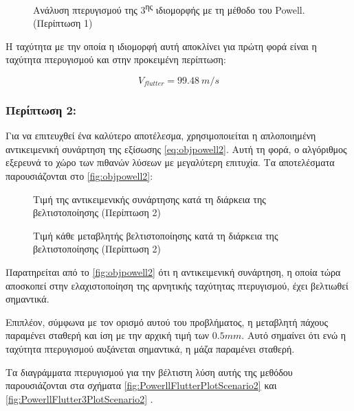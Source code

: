 \begin{figure}[H]
    \centering
    
    \caption{Ανάλυση πτερυγισμού της 3\textsuperscript{ης} ιδιομορφής με τη μέθοδο του \textlatin{Powell}. (Περίπτωση 1)}
    \label{fig:Mode3FlutteranalysisPowellsmethodScenario1}
\end{figure}

Η ταχύτητα με την οποία η ιδιομορφή αυτή αποκλίνει για πρώτη φορά είναι η ταχύτητα πτερυγισμού και στην προκειμένη περίπτωση:


\begin{equation}
V_{flutter} = 99.48\ m/s
\end{equation}

\subsubsection{Περίπτωση 2:}

Για να επιτευχθεί ένα καλύτερο αποτέλεσμα, χρησιμοποιείται η απλοποιημένη αντικειμενική συνάρτηση της εξίσωσης \eqref{eq:objpowell2}. 
Αυτή τη φορά, ο αλγόριθμος εξερευνά το χώρο των πιθανών λύσεων με μεγαλύτερη επιτυχία. Τα αποτελέσματα παρουσιάζονται στο \autoref{fig:objpowell2}:


\begin{figure}[H]
    \centering
    
    \caption{Τιμή της αντικειμενικής συνάρτησης κατά τη διάρκεια της βελτιστοποίησης (Περίπτωση 2)}
    \label{fig:objpowell2}
\end{figure}

\begin{figure}[H]
  \centering
  
  \caption{Τιμή κάθε μεταβλητής βελτιστοποίησης κατά τη διάρκεια της βελτιστοποίησης (Περίπτωση 2)}
\end{figure}

Παρατηρείται από το \autoref{fig:objpowell2} ότι η αντικειμενική συνάρτηση, η οποία τώρα αποσκοπεί στην ελαχιστοποίηση της αρνητικής ταχύτητας πτερυγισμού, έχει βελτιωθεί σημαντικά.

Επιπλέον, σύμφωνα με τον ορισμό αυτού του προβλήματος, η μεταβλητή πάχους παραμένει σταθερή και ίση με την αρχική τιμή των $0.5 mm$. Αυτό σημαίνει ότι ενώ η ταχύτητα πτερυγισμού αυξάνεται σημαντικά, η μάζα παραμένει σταθερή.

Τα διαγράμματα πτερυγισμού για την βέλτιστη λύση αυτής της μεθόδου παρουσιάζονται στα σχήματα \ref{fig:PowerllFlutterPlotScenario2} και \ref{fig:PowerllFlutter3PlotScenario2} .


